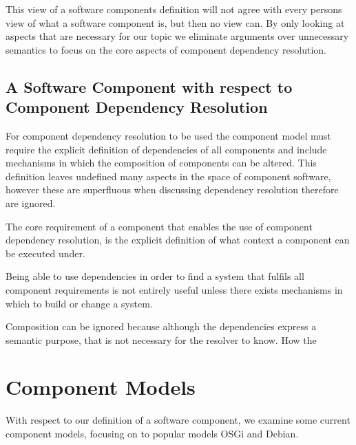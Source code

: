 {}This view of a software components definition will not agree with every persons view of what a software component is, but then no view can.
{}By only looking at aspects that are necessary for our topic we eliminate arguments over unnecessary semantics to focus on the core aspects of component dependency resolution. 

\subsection{A Software Component with respect to Component Dependency Resolution}
For component dependency resolution to be used the component model must require the explicit definition of dependencies of all components
and include mechanisms in which the composition of components can be altered.
This definition leaves undefined many aspects in the space of component software, however these are superfluous when discussing dependency resolution therefore are ignored.

The core requirement of a component that enables the use of component dependency resolution, is the explicit definition of what context a component can be executed under.

Being able to use dependencies in order to find a system that fulfils all component requirements is not entirely useful unless there exists mechanisms in which to build or change a system.

Composition can be ignored because although the dependencies express a semantic purpose, that is not necessary for the resolver to know.
How the 

\section{Component Models}
With respect to our definition of a software component, we examine some current component models, focusing on to popular models OSGi and Debian.



